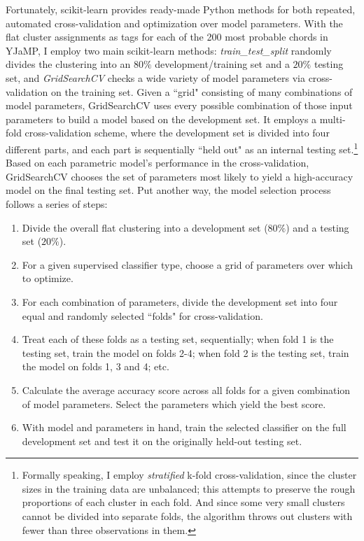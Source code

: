 Fortunately, scikit-learn provides ready-made Python methods for both repeated, automated cross-validation and optimization over model parameters.  With the flat cluster assignments as tags for each of the 200 most probable chords in YJaMP, I employ two main scikit-learn methods: \emph{train\_test\_split} randomly divides the clustering into an $80\%$ development/training set and a $20\%$ testing set, and \emph{GridSearchCV} checks a wide variety of model parameters via cross-validation on the training set.  Given a ``grid" consisting of many combinations of model parameters, GridSearchCV uses every possible combination of those input parameters to build a model based on the development set.  It employs a multi-fold cross-validation scheme, where the development set is divided into four different parts, and each part is sequentially ``held out" as an internal testing set.\footnote{Formally speaking, I employ \emph{stratified} k-fold cross-validation, since the cluster sizes in the training data are unbalanced; this attempts to preserve the rough proportions of each cluster in each fold.  And since some very small clusters cannot be divided into separate folds, the algorithm throws out clusters with fewer than three observations in them.}  Based on each parametric model's performance in the cross-validation, GridSearchCV chooses the set of parameters most likely to yield a high-accuracy model on the final testing set.  Put another way, the model selection process follows a series of steps:

\begin{enumerate}
	\item Divide the overall flat clustering into a development set ($80\%$) and a testing set ($20\%$).
	\item For a given supervised classifier type, choose a grid of parameters over which to optimize.
	\item For each combination of parameters, divide the development set into four equal and randomly selected ``folds" for cross-validation.
	\item Treat each of these folds as a testing set, sequentially; when fold 1 is the testing set, train the model on folds 2-4; when fold 2 is the testing set, train the model on folds 1, 3 and 4; etc.
	\item Calculate the average accuracy score across all folds for a given combination of model parameters.  Select the parameters which yield the best score.
	\item With model and parameters in hand, train the selected classifier on the full development set and test it on the originally held-out testing set.
\end{enumerate}

